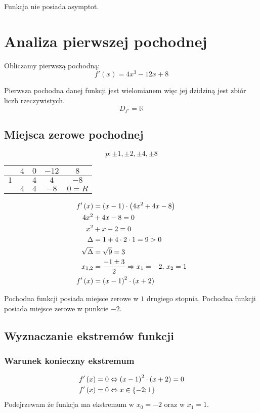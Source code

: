 \documentclass[a4paper,12pt]{article}
\newcommand{\podx}{
		\ensuremath f' \left( x \right)
	}
\begin{document}
Funkcja nie posiada asymptot. 

\section{Analiza pierwszej pochodnej}
Obliczamy pierwszą pochodną:
\[ f' \left( x \right) = 4x^3 - 12x + 8 \]

Pierwsza pochodna danej funkcji jest wielomianem więc jej dzidziną jest zbiór liczb rzeczywistych.
\[ D_{f'} = \mathbb{R} \]

\subsection{Miejsca zerowe pochodnej}
\[ p: \pm 1, \pm 2, \pm 4, \pm 8\]
\begin{center}
	\begin{tabular}{l|c|c|c|c}		
		& $4$	& $0$	& $-12$	& $8$	\\ \hline
	$1$	&	& $4$	& $4$	& $-8$	\\ \hline
		& $4$	& $4$	& $-8$	& $0 = R$\\ 
	\end{tabular}
\end{center}
\begin{align*}
	\podx &= \left( x - 1 \right) \cdot \left( 4x^2 + 4x - 8 \right) \\
	4x^2 &+ 4x - 8 = 0 \\
	x^2 &+ x - 2 = 0 \\
	\Delta &= 1 + 4 \cdot 2 \cdot 1 = 9 > 0\\
	\sqrt{\Delta} &= \sqrt{9} = 3\\
	x_{1, 2} &= \frac{-1 \pm 3}{2} \Rightarrow x_1 = -2, \, x_2 = 1\\
	\podx &= \left( x - 1 \right)^2 \cdot \left( x + 2 \right)
\end{align*}

Pochodna funkcji posiada miejsce zerowe w $1$ drugiego stopnia. Pochodna funkcji posiada miejsce zerowe w punkcie $-2$. 

\subsection{Wyznaczanie ekstremów funkcji}
\subsubsection*{Warunek konieczny ekstremum}

\begin{align*}
	\podx &= 0 \Leftrightarrow \left( x - 1 \right)^2 \cdot \left( x + 2 \right)  = 0\\
	\podx &= 0 \Leftrightarrow x \in \left\{ -2; 1 \right\}
\end{align*}
Podejrzewam że funkcja ma ekstremum w $x_0 = -2$ oraz w $x_1 = 1$.
\end{document}
